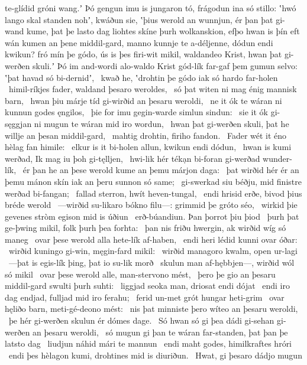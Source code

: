 te-glídid gróni wang.ʼ Þó gengun imu is jungaron tó,
frágodun ina só stillo: ʽhwó lango skal standen nohʼ, kwáðun sie,
ʽþius werold an wunnjun, ér þan þat gi-wand kume,
þat þe lasto dag liohtes skíne
þurh wolkanskion, efþo hwan is þín eft wán kumen
an þene middil-gard, manno kunnje
te a-déljenne, dódun endi kwikun?
fró mín þe gódo, ús is þes firi-wit mikil,
waldandeo Krist, hwan þat gi-werðen skuli.ʼ
Þó im and-wordi alo-waldo Krist
gód-lík far-gaf þem gumun selvo:
ʽþat havad só bi-dernidʼ, \hld\ kwað he, ʽdrohtin þe gódo
iak só hardo far-holen \hld\ himil-ríkjes fader,
waldand þesaro weroldes, \hld\ só þat witen ni mag
énig mannisk barn, \hld\ hwan þiu márje tíd
gi-wirðid an þesaru weroldi, \hld\ ne it ók te wáran ni kunnun
godes ęngilos, \hld\ þie for imu gegin-warde
simlun sindun: \hld\ sie it ók gi-sęggjan ni mugun
te wáran mid iro wordun, \hld\ hwan þat gi-werðen skuli,
þat he willje an þesan middil-gard, \hld\ mahtig drohtin,
firiho fandon. \hld\ Fader wét it éno
hèlag fan himile: \hld\ elkur is it bi-holen allun,
kwikun endi dódun, \hld\ hwan is kumi werðad,
Ik mag iu þoh gi-tęlljen, \hld\ hwi-lik hér tékạn bi-foran
gi-werðad wunder-lík, \hld\ ér þan he an þese werold kume
an þemu márjon daga: \hld\ þat wirðid hér ér an þemu mánon skín
iak an þeru sunnon só same; \hld\ gi-swerkad siu béðju,
mid finistre werðad bi-fangan; \hld\ fallad sterron,
hwít heven-tungal, \hld\ endi hrisid erðe,
bivod þius bréde werold \hld\ —wirðid su-likaro bókno filu—:
grimmid þe gróto séo, \hld\ wirkid þie gevenes stròm
egison mid is úðiun \hld\ erð-búandiun.
Þan þorrot þiu þiod \hld\ þurh þat ge-þwing mikil,
folk þurh þea forhta: \hld\ þan nis friðu hwergin,
ak wirðid wíg só maneg \hld\ ovar þese werold alla
hete-lík af-haben, \hld\ endi heri lédid
kunni ovar óðar: \hld\ wirðid kuningo gi-win,
męgin-fard mikil: \hld\ wirðid managoro kwalm,
open ur-lagi \hld\ —þat is egis-lík þing,
þat io su-lik morð \hld\ skulun man af-hębbjen—,
wirðid wól só mikil \hld\ ovar þese werold alle,
man-stervono mést, \hld\ þero þe gio an þesaru middil-gard
swulti þurh suhti: \hld\ liggjad seoka man,
driosat endi dójat \hld\ endi iro dag endjad,
fulljad mid iro ferahu; \hld\ ferid un-met grót
hungar heti-grim \hld\ ovar hęliðo barn,
meti-gé-deono mést: \hld\ nis þat minniste
þero wíteo an þesaru weroldi, \hld\ þe hér gi-werðen skulun
ér dómes dage. \hld\ Só hwan só gi þea dádi gi-sehan
gi-werðen an þesaru weroldi, \hld\ só mugun gi þan te wáran far-standen,
þat þan þe latsto dag \hld\ liudjun náhid
mári te mannun \hld\ endi maht godes,
himilkraftes hróri \hld\ endi þes hèlagon kumi,
drohtines mid is diuriðun. \hld\ Hwat, gi þesaro dádjo mugun
